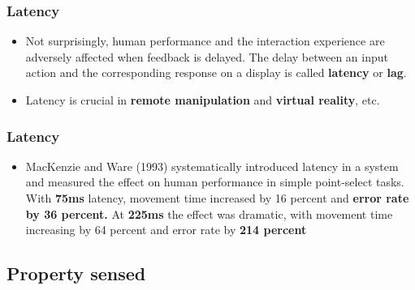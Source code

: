 \documentclass{beamer}
\begin{document}
\begin{frame}
	\frametitle{Latency}
	\begin{itemize}
		\item Not surprisingly, human performance and the interaction experience are adversely affected when feedback is delayed. The delay between an input action and the corresponding response on a display is called \textbf{latency} or \textbf{lag}.
		\item Latency is crucial in \textbf{remote manipulation} and \textbf{virtual reality}, etc.
	\end{itemize}
\end{frame}

\begin{frame}
	\frametitle{Latency}
	\begin{itemize}
		\item MacKenzie and Ware (1993) systematically introduced latency in a system and measured the effect on human performance in simple point-select tasks. With \textbf{75ms} latency, movement time increased by 16 percent and \textbf{error rate by 36 percent.} At \textbf{225ms} the effect was dramatic, with movement time increasing by 64 percent and error rate by \textbf{214 percent}
	\end{itemize}
\end{frame}

\subsection{Property sensed}
\end{document}
